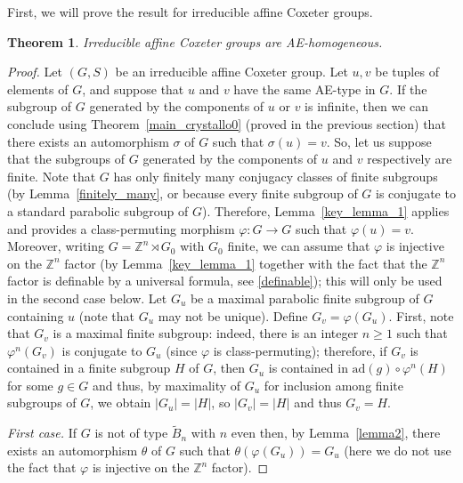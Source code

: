 \documentclass[a4paper, 11pt]{amsart}
\newtheorem{te}{Theorem}[section]
\theoremstyle{definition}
\theoremstyle{remark}
\renewcommand{\geq}{\geqslant}
\begin{document}
First, we will prove the result for irreducible affine Coxeter groups.

\begin{te}\label{details}
Irreducible affine Coxeter groups are AE-homogeneous.    
\end{te}

\begin{proof}Let $(G,S)$ be an irreducible affine Coxeter group. Let $u,v$ be tuples of elements of $G$, and suppose that $u$ and $v$ have the same AE-type in $G$. If the subgroup of $G$ generated by the components of $u$ or $v$ is infinite, then we can conclude using Theorem~\ref{main_crystallo0} (proved in the previous section) that there exists an automorphism $\sigma$ of $G$ such that $\sigma(u)=v$. So, let us suppose that the subgroups of $G$ generated by the components of $u$ and $v$ respectively are finite. Note that $G$ has only finitely many conjugacy classes of finite subgroups (by Lemma~\ref{finitely_many}, or because every finite subgroup of $G$ is conjugate to a standard parabolic subgroup of $G$). Therefore, Lemma~\ref{key_lemma_1} applies and provides a class-permuting morphism $\varphi : G\rightarrow G$ such that $\varphi(u)=v$. Moreover, writing $G=\mathbb{Z}^n \rtimes G_0$ with $G_0$ finite, we can assume that $\varphi$ is injective on the $\mathbb{Z}^n$ factor (by Lemma~\ref{key_lemma_1} together with the fact that the $\mathbb{Z}^n$ factor is definable by a universal formula, see \ref{definable}); this will only be used in the second case below. Let $G_u$ be a maximal parabolic finite subgroup of $G$ containing $u$ (note that $G_u$ may not be unique). Define $G_v=\varphi(G_u)$. First, note that $G_v$ is a maximal finite subgroup: indeed, there is an integer $n\geq 1$ such that $\varphi^n(G_v)$ is conjugate to $G_u$ (since $\varphi$ is class-permuting); therefore, if $G_v$ is contained in a finite subgroup $H$ of $G$, then $G_u$ is contained in $\mathrm{ad}(g)\circ \varphi^n(H)$ for some $g\in G$ and thus, by maximality of $G_u$ for inclusion among finite subgroups of $G$, we obtain $\vert G_u\vert=\vert H\vert$, so $\vert G_v\vert=\vert H \vert$ and thus $G_v=H$. 

\emph{First case.} If $G$ is not of type $\tilde{B}_n$ with $n$ even then, by Lemma~\ref{lemma2}, there exists an automorphism $\theta$ of $G$ such that $\theta(\varphi(G_u))=G_u$ (here we do not use the fact that $\varphi$ is injective on the $\mathbb{Z}^n$ factor).


\end{proof}
\end{document}
